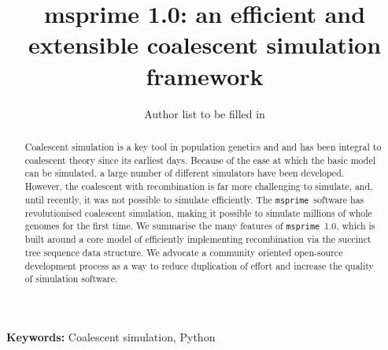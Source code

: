 \documentclass{article}
\newcommand{\msprime}[0]{\texttt{msprime}}
\newcommand{\msprime}[0]{{\texttt{msprime} }}
\begin{document}
\title{msprime 1.0: an efficient and extensible coalescent simulation framework}
\author{Author list to be filled in
}


\maketitle



\begin{abstract}
Coalescent simulation is a key tool in population genetics and
and has been integral to coalescent theory since its earliest days.
Because of the ease at which the basic model can be simulated,
a large number of different simulators have been developed. However,
the coalescent with recombination is far more challenging to simulate,
and, until recently, it was not possible to simulate efficiently.
The \msprime\ software has revolutionised
coalescent simulation, making it possible to simulate millions
of whole genomes for the first time. We summarise the many features
of \msprime\ 1.0, which is built around a core model of efficiently
implementing recombination via the succinct tree sequence data
structure. We advocate a community oriented open-source development
process as a way to reduce duplication of effort and increase
the quality of simulation software.
\end{abstract}

\textbf{Keywords:} Coalescent simulation, Python

\end{document}

